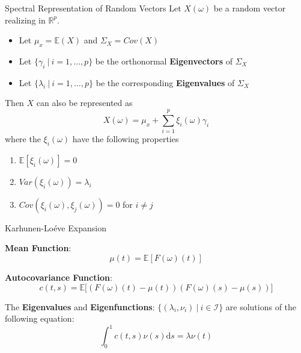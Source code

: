 \documentclass{beamer}
\begin{document}
	\begin{frame}{Spectral Representation of Random Vectors}
		Let $X(\omega)$ be a random vector realizing in $\mathbb{R}^p$.

		\begin{itemize}
			\item Let $\mu_x = \mathbb{E}(X)$ and $\Sigma_X = Cov(X)$
			\item Let $\{\gamma_i \: \vert \: i = 1, \dots, p\}$ be the orthonormal \textbf{Eigenvectors} of $\Sigma_X$
			\item Let $\{\lambda_i \: \vert \: i = 1, \dots, p\}$ be the corresponding \textbf{Eigenvalues} of $\Sigma_X$
		\end{itemize}
	
		\vspace{0.2cm}
		Then $X$ can also be represented as
		$$X(\omega) = \mu_x + \sum_{i = 1}^{p} \xi_i(\omega) \gamma_i$$
		where the $\xi_i(\omega)$ have the following properties
		
		\begin{multicols}{2}
			\begin{enumerate}
				\item $\mathbb{E}[\xi_i(\omega)] = 0$
				\item $Var(\xi_i(\omega)) = \lambda_i$
				\item $Cov(\xi_i(\omega), \xi_j(\omega)) = 0$ for $i \neq j$
			\end{enumerate}
		\end{multicols}
	\end{frame}

	\begin{frame}{Karhunen-Lo\'{e}ve Expansion}
		
		\textbf{Mean Function}: $$\mu(t) = \mathbb{E}\left[ F(\omega)(t) \right]$$

		\textbf{Autocovariance Function}: $$c(t,s) = \mathbb{E}\big[ \left( F(\omega)(t) - \mu(t) \right) \left( F(\omega)(s) - \mu(s) \right) \big]$$
		
		The \textbf{Eigenvalues} and \textbf{Eigenfunctions}: $\{(\lambda_i, \nu_i) \: \vert \: i \in \mathcal{I}\}$  are solutions of the following equation:
		$$ \int_{0}^{1}c(t,s)\nu(s) \mathrm{d}s = \lambda \nu(t) $$
	\end{frame}
	
\end{document}
